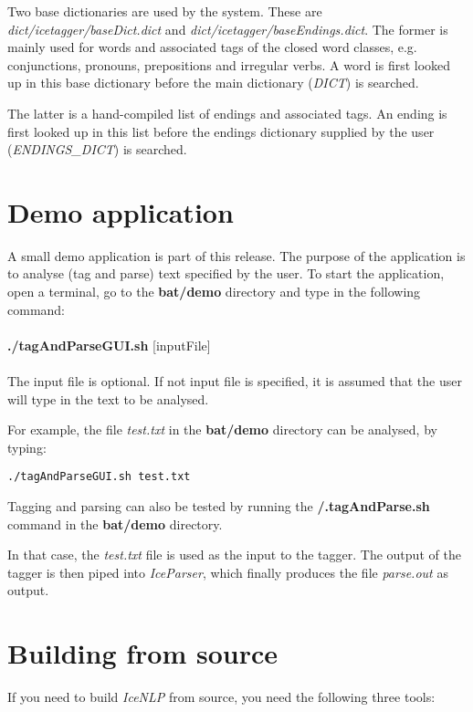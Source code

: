 \documentclass[11pt]{article}
\begin{document}
Two base dictionaries are used by the system.
These are \emph{dict/icetagger/baseDict.dict} and \emph{dict/icetagger/baseEndings.dict}.
The former is mainly used for words and associated tags of the closed word classes, e.g. conjunctions, pronouns, prepositions and irregular verbs.
A word is first looked up in this base dictionary before the main dictionary (\emph{DICT}) is searched.

The latter is a hand-compiled list of endings and associated tags.
An ending is first looked up in this list before the endings dictionary supplied by the user (\emph{ENDINGS\_DICT}) is searched.

\section{Demo application}
\label{sec:demo}
A small demo application is part of this release.
The purpose of the application is to analyse (tag and parse) text specified by the user.
To start the application, open a terminal, go to the \textbf{bat/demo} directory and type in the following command:\\ \\

{\bf ./tagAndParseGUI.sh} [inputFile]  \\ \\

The input file is optional.
If not input file is specified, it is assumed that the user will type in the text to be analysed.

For example, the file \emph{test.txt} in the \textbf{bat/demo} directory can be analysed, by typing:
\begin{verbatim}
./tagAndParseGUI.sh test.txt
\end{verbatim}

Tagging and parsing can also be tested by running the \textbf{/.tagAndParse.sh} command in the \textbf{bat/demo} directory.  

In that case, the \emph{test.txt} file is used as the input to the tagger.  The output of the tagger is then piped into \textit{IceParser}, which finally produces the file \emph{parse.out} as output.

\section{Building from source}
If you need to build  \emph{IceNLP} from source, you need the following three tools:
\end{document}
